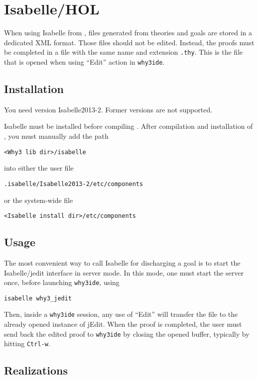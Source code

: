 \section{Isabelle/HOL}
\label{sec:isabelle}


When using Isabelle from \why, files generated from \why theories and
goals are stored in a dedicated XML format. Those files should not be
edited. Instead, the proofs must be completed in a file with the same
name and extension \texttt{.thy}. This is the file that is opened when
using ``Edit'' action in \texttt{why3ide}.

\subsection{Installation}

You need version Isabelle2013-2. Former versions are not supported.

Isabelle must be installed before compiling \why. After compilation
and installation of \why, you must manually add the path
\begin{verbatim}
<Why3 lib dir>/isabelle
\end{verbatim}
into either the user file
\begin{verbatim}
.isabelle/Isabelle2013-2/etc/components
\end{verbatim}
or the system-wide file
\begin{verbatim}
<Isabelle install dir>/etc/components
\end{verbatim}

\subsection{Usage}

The most convenient way to call Isabelle for discharging a \why goal
is to start the Isabelle/jedit interface in server mode. In this mode,
one must start the server once, before launching \texttt{why3ide},
using
\begin{verbatim}
isabelle why3_jedit
\end{verbatim}
Then, inside a \texttt{why3ide} session, any use of ``Edit'' will
transfer the file to the already opened instance of jEdit. When the
proof is completed, the user must send back the edited proof to
\texttt{why3ide} by closing the opened buffer, typically by hitting
\texttt{Ctrl-w}.

\subsection{Realizations}

